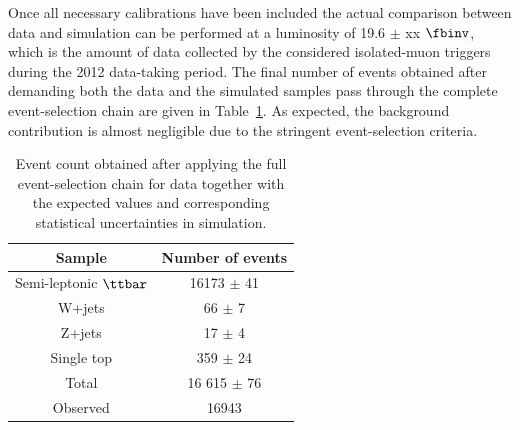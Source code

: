 Once all necessary calibrations have been included the actual comparison between data and simulation can be performed at a luminosity of 19.6 $\pm$ xx $\fbinv$, which is the amount of data collected by the considered isolated-muon triggers during the 2012 data-taking period.
The final number of events obtained after demanding both the data and the simulated samples pass through the complete event-selection chain are given in Table~\ref{table::DataMCComp}.
As expected, the background contribution is almost negligible due to the stringent event-selection criteria.
\begin{table}[h!t]
 \caption{Event count obtained after applying the full event-selection chain for data together with the expected values and corresponding statistical uncertainties in simulation.} \label{table::DataMCComp}
 \centering
 \begin{tabular}{c|c}
  \hline
  Sample 			& Number of events 	\\
  \hline
  \hline
  Semi-leptonic $\ttbar$ 	& 16173 $\pm$ 41 	\\
  W+jets 			& 66 $\pm$ 7		\\
  Z+jets 			& 17 $\pm$ 4		\\       %
  Single top 			& 359 $\pm$ 24		\\
  \hline
  Total				& 16 615 $\pm$ 76	\\
  \hline
  \hline
  Observed			& 16943			\\
  \hline
 \end{tabular}
\end{table}

